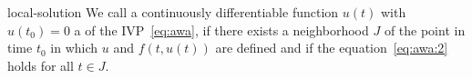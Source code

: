 \begin{Definition}{local-solution}
    \label{def:awa:local solution}
   We call a continuously differentiable
  function $u(t)$ with $u(t_0) = 0$ a  of the
  IVP~\eqref{eq:awa}, if there exists a neighborhood $J$ of the point
  in time $t_0$ in which $u$ and $f(t,u(t))$ are defined and if the
  equation~\eqref{eq:awa:2} holds for all $t\in J$.
\end{Definition}